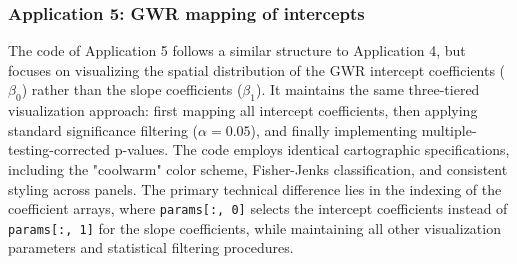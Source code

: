 \documentclass[smallextended, natbib]{svjour3}       %
\begin{document}
\subsubsection*{Application 5: GWR mapping of intercepts}

The code of Application 5 follows a similar structure to Application 4, but focuses on visualizing the spatial distribution of the GWR intercept coefficients ($\beta_0$) rather than the slope coefficients ($\beta_1$). 
It maintains the same three-tiered visualization approach: first mapping all intercept coefficients, then applying standard significance filtering ($\alpha = 0.05$), and finally implementing multiple-testing-corrected p-values. 
The code employs identical cartographic specifications, including the "coolwarm" color scheme, Fisher-Jenks classification, and consistent styling across panels. 
The primary technical difference lies in the indexing of the coefficient arrays, where \texttt{params[:, 0]} selects the intercept coefficients instead of \texttt{params[:, 1]} for the slope coefficients, while maintaining all other visualization parameters and statistical filtering procedures.
\end{document}
